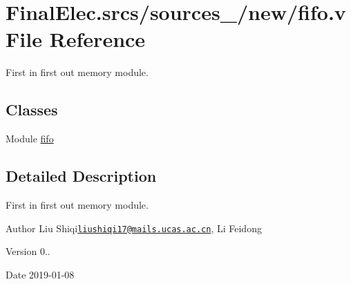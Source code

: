 \hypertarget{fifo_8v}{}\section{Final\+Elec.\+srcs/sources\+\_/new/fifo.v File Reference}
\label{fifo_8v}


First in first out memory module.  


\subsection*{Classes}
\begin{DoxyCompactItemize}
\item 
Module \mbox{\hyperlink{enumfifo}{fifo}}
\end{DoxyCompactItemize}


\subsection{Detailed Description}
First in first out memory module. 

\begin{DoxyAuthor}{Author}
Liu Shiqi\href{mailto:liushiqi17@mails.ucas.ac.cn}{\tt liushiqi17@mails.\+ucas.\+ac.\+cn}, Li Feidong 
\end{DoxyAuthor}
\begin{DoxyVersion}{Version}
0.. 
\end{DoxyVersion}
\begin{DoxyDate}{Date}
2019-\/01-\/08 
\end{DoxyDate}
